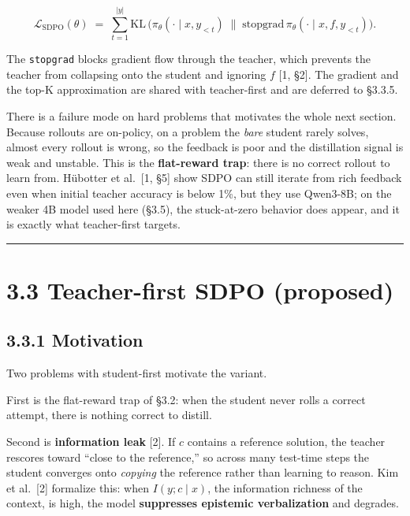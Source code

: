 \[
\mathcal{L}_{\text{SDPO}}(\theta) \;=\; \sum_{t=1}^{|y|} \mathrm{KL}\,\Big(\pi_\theta(\cdot \mid x, y_{<t}) \;\big\|\; \mathrm{stopgrad}\,\pi_\theta(\cdot \mid x, f, y_{<t})\Big).
\]

The \passthrough{\lstinline!stopgrad!} blocks gradient flow through the teacher, which prevents the teacher from collapsing onto the student and ignoring \(f\) {[}1, §2{]}. The gradient and the top-K approximation are shared with teacher-first and are deferred to §3.3.5.

There is a failure mode on hard problems that motivates the whole next section. Because rollouts are on-policy, on a problem the \emph{bare} student rarely solves, almost every rollout is wrong, so the feedback is poor and the distillation signal is weak and unstable. This is the \textbf{flat-reward trap}: there is no correct rollout to learn from. Hübotter et al.~{[}1, §5{]} show SDPO can still iterate from rich feedback even when initial teacher accuracy is below 1\%, but they use Qwen3-8B; on the weaker 4B model used here (§3.5), the stuck-at-zero behavior does appear, and it is exactly what teacher-first targets.

\begin{center}\rule{0.5\linewidth}{0.5pt}\end{center}

\section{3.3 Teacher-first SDPO (proposed)}\label{teacher-first-sdpo-proposed}

\subsection{3.3.1 Motivation}\label{motivation}

Two problems with student-first motivate the variant.

First is the flat-reward trap of §3.2: when the student never rolls a correct attempt, there is nothing correct to distill.

Second is \textbf{information leak} {[}2{]}. If \(c\) contains a reference solution, the teacher rescores toward ``close to the reference,'' so across many test-time steps the student converges onto \emph{copying} the reference rather than learning to reason. Kim et al.~{[}2{]} formalize this: when \(I(y; c \mid x)\), the information richness of the context, is high, the model \textbf{suppresses epistemic verbalization} and degrades.

